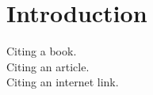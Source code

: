 \section{Introduction}\label{sec:introduction}
Citing a book.\cite{book}\\
Citing an article.\cite{article}\\
Citing an internet link.\cite{Senn:2009}
